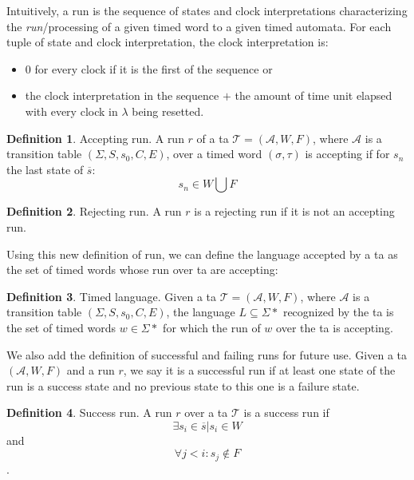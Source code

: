 \documentclass[12pt]{article}
\theoremstyle{definition}
\newtheorem{definition}{Definition}[section]
\theoremstyle{definition}
\theoremstyle{remark}
\newcommand{\A}{\mathcal{A}}
\begin{document}
Intuitively, a run is the sequence of states and clock interpretations characterizing the \textit{run}/processing of a given timed word to a given timed automata. For each tuple of state and clock interpretation, the clock interpretation is:
\begin{itemize}
\item $0$ for every clock if it is the first of the sequence or
\item the clock interpretation in the sequence $+$ the amount of time unit elapsed with every clock in $\lambda$ being resetted.
\end{itemize}

\theoremstyle{definition}
\begin{definition}{Accepting run.} A run $r$ of a \gls{ta} $\mathcal{T} = (\A, W, F)$, where $\A$ is a transition table $(\Sigma, S, s_{0},C, E)$, over a timed word $(\sigma, \tau)$ is accepting if for $s_{n}$ the last state of $\overline{s}$:
$$s_{n} \in W \bigcup F$$
\end{definition}

\theoremstyle{definition}
\begin{definition}{Rejecting run.} A run $r$ is a rejecting run if it is not an accepting run.
\end{definition}

Using this new definition of run, we can define the language accepted by a \gls{ta} as the set of timed words whose run over \gls{ta} are accepting:

\theoremstyle{definition}
\begin{definition}{Timed language.} Given a \gls{ta} $\mathcal{T} = (\A, W, F)$, where $\A$ is a transition table $(\Sigma, S, s_{0},C, E)$, the language $L \subseteq \Sigma*$ recognized by the \gls{ta} is the set of timed words $w \in \Sigma*$ for which the run of $w$ over the \gls{ta} is accepting.
\end{definition}

We also add the definition of successful and failing runs for future use. Given a \gls{ta} $(\A, W, F)$ and a run $r$, we say it is a successful run if at least one state of the run is a success state and no previous state to this one is a failure state.

\begin{definition}{Success run.} A run $r$ over a \gls{ta} $\mathcal{T}$ is a success run if
$$\exists s_i \in \overline{s} | s_i \in W$$ and $$\forall j < i: s_j \notin F$$.
\end{definition}
\end{document}
